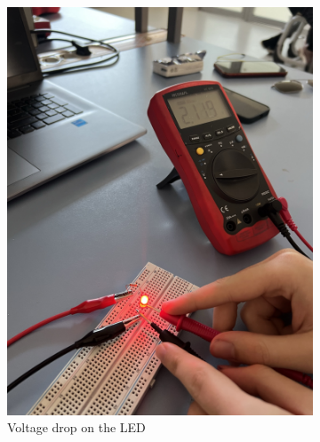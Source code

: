 \documentclass[a4paper, 10pt]{article}
\begin{document}
			
			\begin{figure}[h!]
				\centering
				\begin{subfigure}[b]{0.35\textwidth}
					\includegraphics[width=\textwidth]{./images/Circ1_VDrop_LED.jpeg}
					\caption{Voltage drop on the LED}
					\label{sub-fig:VDropLEDCirc1}	
				\end{subfigure}
				\hspace{0.1\textwidth} %
				\begin{subfigure}[b]{0.35\textwidth}

\end{subfigure}
\end{figure}
\end{document}

